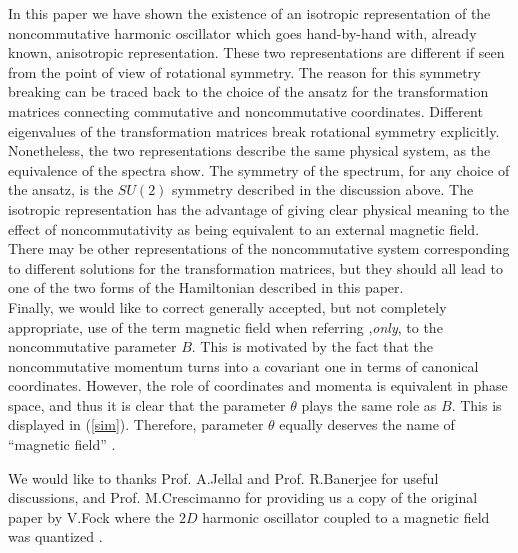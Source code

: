 \documentclass[a4paper,aps,prd,preprint]{revtex4}
\begin{document}
    In this paper we have shown the existence of an isotropic representation
    of the noncommutative harmonic oscillator which goes hand-by-hand with,
    already known, anisotropic representation. These two representations are
    different if seen from the point of view of rotational symmetry. The
    reason for this symmetry breaking can be traced back to the choice of the
    ansatz for the transformation matrices connecting commutative and
    noncommutative coordinates. Different eigenvalues of the  transformation
    matrices break rotational symmetry explicitly. Nonetheless, the two
    representations describe the same physical system,  as the
    equivalence of the spectra show. 
    The symmetry of the spectrum, for any choice of the ansatz, is the $SU(2)$ 
    symmetry described in the discussion above. 
    The isotropic representation has the advantage of giving clear physical
    meaning to the effect of noncommutativity as being equivalent to an external
    magnetic field.  There may be other representations  of
    the noncommutative system corresponding to different  solutions for
    the transformation matrices, but they should all lead to one of the
    two forms of the Hamiltonian described in this paper.\\
    Finally, we would like to correct generally
    accepted, but not completely appropriate, use of the term magnetic field 
    when referring ,{\it only}, to  the noncommutative parameter $B$. This is
    motivated by the fact that the noncommutative momentum turns into
    a covariant one in terms of canonical coordinates. However, the role
    of coordinates and momenta is equivalent in phase space, and thus
    it is  clear that the parameter $\theta$ plays  the same role as $B$. 
    This is displayed in (\ref{sim}). Therefore, parameter $\theta$
    equally deserves the name of ``magnetic field'' \cite{baner}. 
   
   \begin{acknowledgments}
   We would like to thanks Prof. A.Jellal and Prof. R.Banerjee for useful
    discussions, and Prof. M.Crescimanno for providing us a copy of the original
   paper by V.Fock where the $2D$ harmonic oscillator coupled to a magnetic
   field was quantized \cite{fock}.
   \end{acknowledgments}
   
\end{document}
